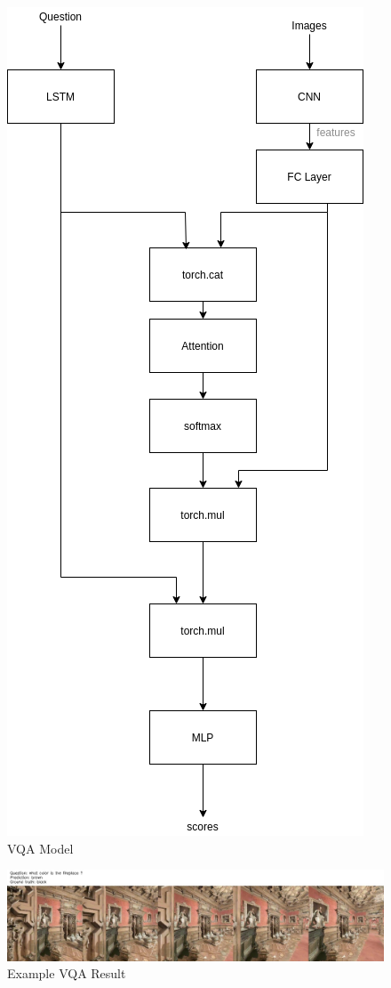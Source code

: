 
\begin{figure}[H]
     \centering
     \includegraphics[width=.5\textwidth]{./figure/baseline_diagram.png}
     \caption{VQA Model}
     \label{fig:baseline_model}
\end{figure}

\begin{figure}[H]
	\centering
        \includegraphics[width=\textwidth]{./figure/results/baseline_and_blindfolding/images/ckpt_23_781_image.jpg}
	\caption{Example VQA Result} %
	\label{fig:example_vqa_result}
\end{figure}

